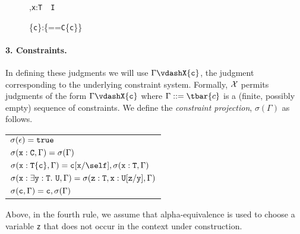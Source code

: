\begin{figure*}
\vspace{-\bigskipamount}
\begin{minipage}{.5\textwidth}
\quad
{}
\infax[W-Type]
	{\wj{}{\type}}

	{\Gamma{}}

	{\Gamma,{\tt x}:{\tt T}~\underline\has~{\tt I}}
\end{minipage}%
\begin{minipage}{.5\textwidth}
\quad{}

	{}

  {\Gamma{}\{{\tt c}\}:\type\{\self=={\tt C}\{{\tt c}\}\}}
\end{minipage}
\caption{\FXG}
\label{fig:FXG}
\end{figure*}

\paragraph{3. Constraints.}
In defining these judgments we will use \mbox{$\Gamma \vdashX {\tt c}$}, the judgment corresponding to the underlying constraint system. Formally, $\cal X$ permits judgments of the form $\Gamma \vdashX {\tt c}$ where $\Gamma::=\tbar{c}$ is a (finite, possibly empty) sequence of constraints. We define the {\em constraint
projection}, $\sigma(\Gamma)$ as follows.
%
\begin{center}
\begin{tabular}{l}
$\sigma(\epsilon)={\tt true}$\\
$\sigma({\tt x}:{\tt C}, \Gamma)=\sigma(\Gamma)$\\
$\sigma({\tt x}:{\tt T\{c\}}, \Gamma)={\tt c}[{\tt x}/\self], \sigma({\tt x}:{\tt T},\Gamma)$\\
$\sigma({\tt x}:\exists {\tt y}:{\tt T}.~{\tt U}, \Gamma)=\sigma({\tt z:T}, {\tt x}:{\tt U[{\tt z}/{\tt y}]},\Gamma)$\\
$\sigma({\tt c},\Gamma) = {\tt c}, \sigma(\Gamma)$
\end{tabular}
\end{center}
%
Above, in the fourth rule, 
we assume that alpha-equivalence is used to
choose a variable {\tt z} that does not
occur in the context under construction.

